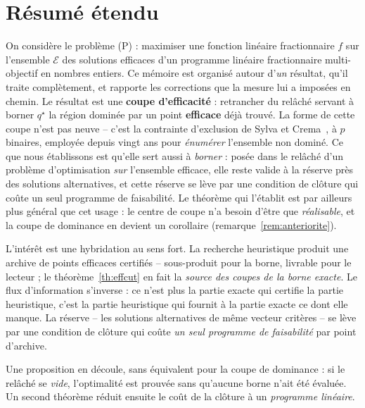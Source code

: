 \documentclass[11pt,a4paper]{article}
\theoremstyle{plain}
\theoremstyle{remark}
\newcommand{\Ecal}{\mathcal{E}}
\newcommand{\qs}{q^{\star}}
\begin{document}
\clearpage
\section*{Résumé étendu}
\noindent
On considère le problème (P) : maximiser une fonction linéaire fractionnaire
$f$ sur l'ensemble $\Ecal$ des solutions efficaces d'un programme linéaire
fractionnaire multi-objectif en nombres entiers. Ce mémoire est organisé
autour d'\emph{un} résultat, qu'il traite complètement, et rapporte les
corrections que la mesure lui a imposées en chemin. Le résultat est une
\textbf{coupe d'efficacité} : retrancher du relâché servant à borner $\qs$
la région dominée par un point \textbf{efficace} déjà trouvé. La forme de
cette coupe n'est pas neuve -- c'est la contrainte d'exclusion de Sylva et
Crema~\cite{sylva2004,sylva2007}, à $p$ binaires, employée depuis vingt ans
pour \emph{énumérer} l'ensemble non dominé. Ce que nous établissons est
qu'elle sert aussi à \emph{borner} : posée dans le relâché d'un problème
d'optimisation \emph{sur} l'ensemble efficace, elle reste valide à la
réserve près des solutions alternatives, et cette réserve se lève par une
condition de clôture qui coûte un seul programme de faisabilité. Le
théorème qui l'établit est par ailleurs plus général que cet usage : le
centre de coupe n'a besoin d'être que \emph{réalisable}, et la coupe de
dominance en devient un corollaire (remarque~\ref{rem:anteriorite}).

L'intérêt est une hybridation au sens fort. La recherche heuristique produit
une archive de points efficaces certifiés -- sous-produit pour la borne,
livrable pour le lecteur ; le
théorème~\ref{th:effcut} en fait la \emph{source des coupes de la borne
exacte}. Le flux d'information s'inverse : ce n'est plus la partie exacte qui
certifie la partie heuristique, c'est la partie heuristique qui fournit à la
partie exacte ce dont elle manque. La réserve -- les solutions alternatives
de même vecteur critères -- se lève par une condition de clôture qui coûte
\emph{un seul programme de faisabilité} par point d'archive.

Une proposition en découle, sans équivalent pour la coupe de dominance : si
le relâché se \emph{vide}, l'optimalité est prouvée sans qu'aucune borne
n'ait été évaluée. Un second théorème réduit ensuite le coût de la clôture
à un \emph{programme linéaire}.
\end{document}
